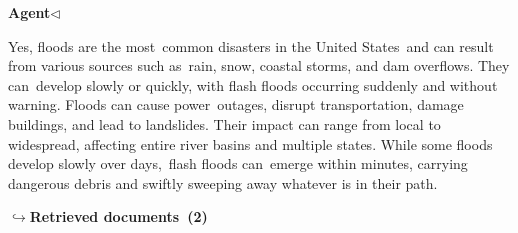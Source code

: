 \documentclass[a4paper,11pt]{article}
\begin{document}
\noindent\hfill{\small\textcolor{agentcolor}{\textbf{Agent\enspace$\triangleleft$}}}
\begin{agentbubble}
Yes, floods are the most common disasters in the United States and can result from various sources such as rain, snow, coastal storms, and dam overflows. They can develop slowly or quickly, with flash floods occurring suddenly and without warning. Floods can cause power outages, disrupt transportation, damage buildings, and lead to landslides. Their impact can range from local to widespread, affecting entire river basins and multiple states. While some floods develop slowly over days, flash floods can emerge within minutes, carrying dangerous debris and swiftly sweeping away whatever is in their path.
\end{agentbubble}
\noindent\hfill{\footnotesize\textcolor{doccolor}{\textbf{$\hookrightarrow$\enspace Retrieved documents~(2)}}}
\end{document}
